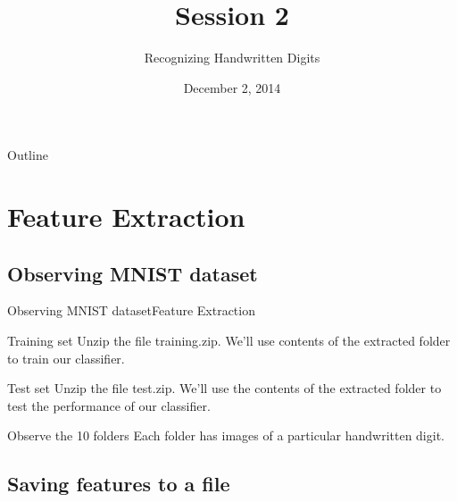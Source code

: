 \documentclass{beamer}
\title{Session 2}
\subtitle{Recognizing Handwritten Digits}
\institute[Computer Vision Group]
{
  Computer Vision Group\\
  IIT Madras
}
\date{December 2, 2014}
\begin{document}
\begin{frame}
  \titlepage
\end{frame}

\begin{frame}{Outline}
  \tableofcontents
\end{frame}

\section{Feature Extraction}

\subsection{Observing MNIST dataset}
\begin{frame}{Observing MNIST dataset}{Feature Extraction}
    \begin{block}{Training set}
        Unzip the file training.zip. We'll use contents of the extracted folder to train
        our classifier.
    \end{block}
    \begin{block}{Test set}
        Unzip the file test.zip. We'll use the contents of the extracted folder to test
        the performance of our classifier.
    \end{block}

    \begin{block}{Observe the 10 folders}
        Each folder has images of a particular handwritten digit. 
    \end{block}
\end{frame}

\subsection{Saving features to a file}
\end{document}
